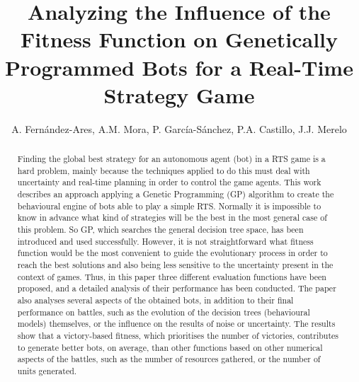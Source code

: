 \documentclass[preprint]{elsarticle}
\begin{document}
\begin{frontmatter}


\title{Analyzing the Influence of the Fitness Function on Genetically Programmed Bots for a Real-Time Strategy Game}


\author{A. Fern{\'a}ndez-Ares, A.M. Mora, P. Garc{\'i}a-S{\'a}nchez, P.A. Castillo, J.J. Merelo}
\address{Departamento de Arquitectura y Tecnología de Computadores.\\ ETSIIT - CITIC. University of Granada, Spain}
\address{Department of Computer Architecture and Technology\\ ETSIIT, CITIC. University of Granada, Spain}


%
%
\begin{abstract}
Finding the global best strategy for an autonomous agent (bot) in a RTS game is a hard problem, mainly because the techniques applied to do this must deal with uncertainty and real-time planning in order to control the game agents. 
This work describes an approach applying a Genetic Programming (GP) algorithm to create the behavioural engine of bots able to play a simple RTS. Normally it is impossible to know in advance what kind of strategies will be the best in the most general case of this problem. So GP, which searches the general decision tree space, has been introduced and used successfully. However, it is not
 straightforward what fitness function would be the most convenient to guide the evolutionary process in order to reach the best solutions and also being less sensitive to the uncertainty present in the context of games. Thus, in this paper three different evaluation functions have been proposed, and a detailed analysis of their performance has been conducted.  
The paper also analyses several aspects of the obtained bots, in addition to their final performance on battles, such as the evolution of the decision
trees (behavioural models) themselves, or the influence on the results of noise or uncertainty.
The results show that a victory-based fitness, which prioritises the
number of victories, contributes to generate better bots, on average,
than other functions based on other numerical aspects of the battles,
such as the number of resources gathered, or the number of units
generated.  
\end{abstract}


\end{frontmatter}
\end{document}
